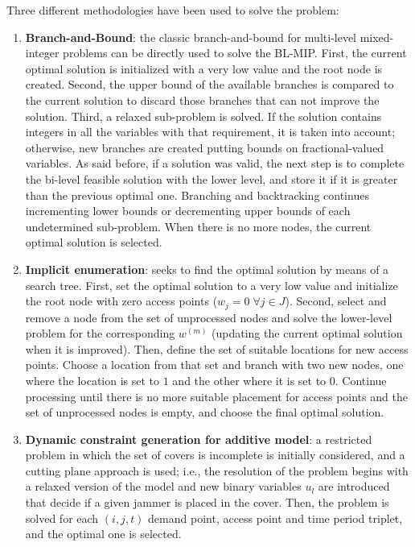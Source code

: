 \documentclass[runningheads]{llncs}
\begin{document}
Three different methodologies have been used to solve the problem:

\begin{enumerate}
  \item \textbf{Branch-and-Bound}: the classic branch-and-bound for multi-level mixed-integer problems can be directly used to solve the BL-MIP. First, the current optimal solution is initialized with a very low value and the root node is created. Second, the upper bound of the available branches is compared to the current solution to discard those branches that can not improve the solution. Third, a relaxed sub-problem is solved. If the solution contains integers in all the variables with that requirement, it is taken into account; otherwise, new branches are created putting bounds on fractional-valued variables. As said before, if a solution was valid, the next step is to complete the bi-level feasible solution with the lower level, and store it if it is greater than the previous optimal one. Branching and backtracking continues incrementing lower bounds or decrementing upper bounds of each undetermined sub-problem. When there is no more nodes, the current optimal solution is selected.
  
  \item \textbf{Implicit enumeration}: seeks to find the optimal solution by means of a search tree. First, set the optimal solution to a very low value and initialize the root node with zero access points ($w_j=0 \; \forall j \in J$). Second, select and remove a node from the set of unprocessed nodes and solve the lower-level problem for the corresponding $w^(m)$ (updating the current optimal solution when it is improved). Then, define the set of suitable locations for new access points. Choose a location from that set and branch with two new nodes, one where the location is set to $1$ and the other where it is set to $0$. Continue processing until there is no more suitable placement for access points and the set of unprocessed nodes is empty, and choose the final optimal solution.
  
  \item \textbf{Dynamic constraint generation for additive model}: a restricted problem in which the set of covers is incomplete is initially considered, and a cutting plane approach is used; i.e., the resolution of the problem begins with a relaxed version of the model and new binary variables $u_l$ are introduced that decide if a given jammer is placed in the cover. Then, the problem is solved for each $(i,j,t)$ demand point, access point and time period triplet, and the optimal one is selected.
\end{enumerate}
\end{document}
